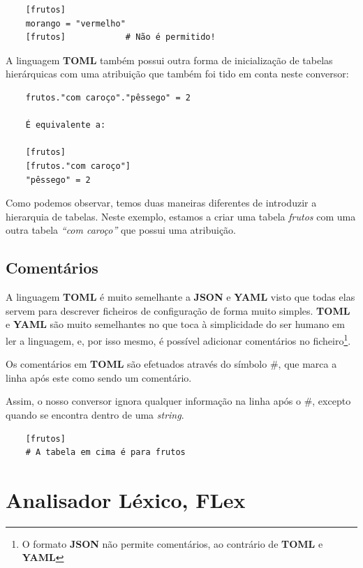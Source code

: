 \documentclass[a4paper,12pt]{report}
\begin{document}
\begin{verbatim}
    [frutos]
    morango = "vermelho"
    [frutos]            # Não é permitido!
\end{verbatim}

\par A linguagem \textbf{TOML} também possui outra forma de inicialização de tabelas hierárquicas com uma atribuição que também foi tido em conta neste conversor:

\begin{verbatim}
    frutos."com caroço"."pêssego" = 2
    
    É equivalente a: 
    
    [frutos]
    [frutos."com caroço"]
    "pêssego" = 2
\end{verbatim}

Como podemos observar, temos duas maneiras diferentes de introduzir a hierarquia de tabelas. Neste exemplo, estamos a criar uma tabela \textit{frutos} com uma outra tabela \textit{``com caroço''} que possui uma atribuição.

\subsection{Comentários}

A linguagem \textbf{TOML} é muito semelhante a \textbf{JSON} e \textbf{YAML} visto que todas elas servem para descrever ficheiros de configuração de forma muito simples. \textbf{TOML} e \textbf{YAML} são muito semelhantes no que toca à simplicidade do ser humano em ler a linguagem, e, por isso mesmo, é possível adicionar comentários no ficheiro\footnote{O formato \textbf{JSON} não permite comentários, ao contrário de \textbf{TOML} e \textbf{YAML}}.

\vspace{0.3cm}

\par Os comentários em \textbf{TOML} são efetuados através do símbolo \#, que marca a linha após este como sendo um comentário.
\par Assim, o nosso conversor ignora qualquer informação na linha após o \#, excepto quando se encontra dentro de uma \textit{string}.

\begin{verbatim}
    [frutos]
    # A tabela em cima é para frutos
\end{verbatim}

\vspace{1cm}

\section{Analisador Léxico, FLex}
\end{document}
